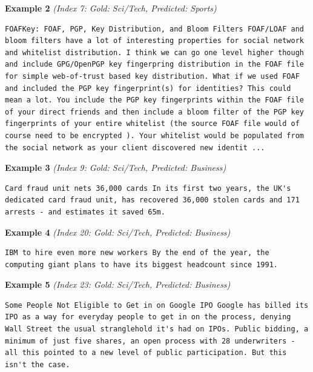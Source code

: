 \noindent
\textbf{Example 2} \quad \textit{(Index 7: Gold: Sci/Tech, Predicted: Sports)}

\begin{Verbatim}[breaklines=true,breakanywhere=true,fontsize=\small]
FOAFKey: FOAF, PGP, Key Distribution, and Bloom Filters FOAF/LOAF and bloom filters have a lot of interesting properties for social network and whitelist distribution. I think we can go one level higher though and include GPG/OpenPGP key fingerpring distribution in the FOAF file for simple web-of-trust based key distribution. What if we used FOAF and included the PGP key fingerprint(s) for identities? This could mean a lot. You include the PGP key fingerprints within the FOAF file of your direct friends and then include a bloom filter of the PGP key fingerprints of your entire whitelist (the source FOAF file would of course need to be encrypted ). Your whitelist would be populated from the social network as your client discovered new identit ...
\end{Verbatim}

\noindent
\textbf{Example 3} \quad \textit{(Index 9: Gold: Sci/Tech, Predicted: Business)}

\begin{Verbatim}[breaklines=true,breakanywhere=true,fontsize=\small]
Card fraud unit nets 36,000 cards In its first two years, the UK's dedicated card fraud unit, has recovered 36,000 stolen cards and 171 arrests - and estimates it saved 65m.
\end{Verbatim}

\noindent
\textbf{Example 4} \quad \textit{(Index 20: Gold: Sci/Tech, Predicted: Business)}

\begin{Verbatim}[breaklines=true,breakanywhere=true,fontsize=\small]
IBM to hire even more new workers By the end of the year, the computing giant plans to have its biggest headcount since 1991.
\end{Verbatim}

\noindent
\textbf{Example 5} \quad \textit{(Index 23: Gold: Sci/Tech, Predicted: Business)}

\begin{Verbatim}[breaklines=true,breakanywhere=true,fontsize=\small]
Some People Not Eligible to Get in on Google IPO Google has billed its IPO as a way for everyday people to get in on the process, denying Wall Street the usual stranglehold it's had on IPOs. Public bidding, a minimum of just five shares, an open process with 28 underwriters - all this pointed to a new level of public participation. But this isn't the case.
\end{Verbatim}

